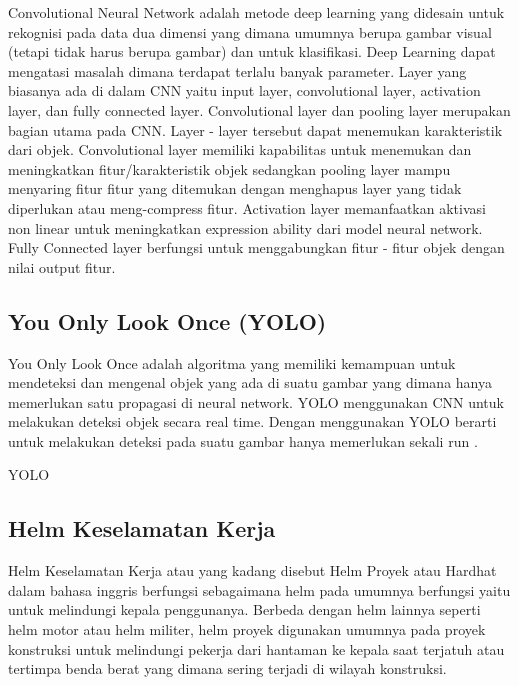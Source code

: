 Convolutional Neural Network adalah metode deep learning yang didesain untuk rekognisi pada data dua dimensi yang dimana umumnya berupa gambar visual (tetapi tidak harus berupa gambar) dan untuk klasifikasi. Deep Learning dapat mengatasi masalah dimana terdapat terlalu banyak parameter.  Layer yang biasanya ada di dalam CNN yaitu input layer, convolutional layer, activation layer, dan fully connected layer.
Convolutional layer dan pooling layer merupakan bagian utama pada CNN. Layer - layer tersebut dapat menemukan karakteristik dari objek. Convolutional layer memiliki kapabilitas untuk menemukan dan meningkatkan fitur/karakteristik objek sedangkan pooling layer mampu menyaring fitur fitur yang ditemukan dengan menghapus layer yang tidak diperlukan atau meng-compress fitur. Activation layer memanfaatkan aktivasi non linear untuk meningkatkan expression ability dari model neural network. Fully Connected layer berfungsi untuk menggabungkan fitur - fitur objek dengan nilai output fitur. \cite{Goodfellow-et-al-2016}

\subsection{You Only Look Once (YOLO)}
\label{sec:youonlylookone}

You Only Look Once adalah algoritma yang memiliki kemampuan untuk mendeteksi dan mengenal 
objek yang ada di suatu gambar yang dimana hanya memerlukan satu propagasi di neural network. 
YOLO menggunakan CNN untuk melakukan deteksi objek secara real time. 
Dengan menggunakan YOLO berarti untuk melakukan deteksi pada suatu gambar hanya memerlukan 
sekali run .\cite{adiwibowo2020deteksi}

YOLO 


\subsection{Helm Keselamatan Kerja}
\label{sec:helmkeselamatankerja}

Helm Keselamatan Kerja atau yang kadang disebut Helm Proyek atau Hardhat  dalam bahasa inggris berfungsi sebagaimana helm pada umumnya berfungsi yaitu untuk melindungi kepala penggunanya. Berbeda dengan helm lainnya seperti helm motor atau helm militer, helm proyek digunakan umumnya pada proyek konstruksi untuk melindungi pekerja dari hantaman ke kepala saat terjatuh atau tertimpa benda berat yang dimana sering terjadi di wilayah konstruksi. \cite{safeopedia_2018}
